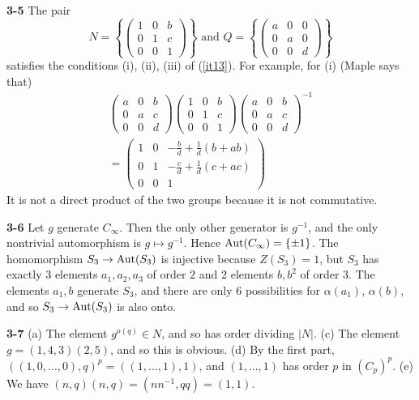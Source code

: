 \documentclass[a4paper,11pt,final,openany]{memoir}%
\theoremstyle{nonumberplain}
\begin{document}
\bigskip\noindent\textbf{3-5}
The pair
\[
N=\left\{
\begin{pmatrix}
1 & 0 & b\\
0 & 1 & c\\
0 & 0 & 1
\end{pmatrix}
\right\}  \text{ and }Q=\left\{
\begin{pmatrix}
a & 0 & 0\\
0 & a & 0\\
0 & 0 & d
\end{pmatrix}
\right\}
\]
satisfies the conditions (i), (ii), (iii) of (\ref{it13}). For example, for
(i) (Maple says that)%
\begin{align*}%
\begin{pmatrix}
a & 0 & b\\
0 & a & c\\
0 & 0 & d
\end{pmatrix}%
\begin{pmatrix}
1 & 0 & b\\
0 & 1 & c\\
0 & 0 & 1
\end{pmatrix}%
\begin{pmatrix}
a & 0 & b\\
0 & a & c\\
0 & 0 & d
\end{pmatrix}
^{-1}\allowbreak\\
=\allowbreak%
\begin{pmatrix}
1 & 0 & -\frac{b}{d}+\frac{1}{d}\left(  b+ab\right) \\
0 & 1 & -\frac{c}{d}+\frac{1}{d}\left(  c+ac\right) \\
0 & 0 & 1
\end{pmatrix}
\end{align*}
It is not a direct product of the two groups because it is not commutative.

\bigskip\noindent\textbf{3-6}
Let $g$ generate $C_{\infty}$. Then the only other generator is $g^{-1}$, and
the only nontrivial automorphism is $g\mapsto g^{-1}$. Hence $\operatorname{Aut}(C_{\infty
})=\{\pm1\}$. The homomorphism $S_{3}\rightarrow\operatorname{Aut}(S_{3})$ is injective
because $Z(S_{3})=1$, but $S_{3}$ has exactly $3$ elements $a_{1},a_{2},a_{3}$
of order $2$ and $2$ elements $b,b^{2}$ of order $3$. The elements $a_{1},b$
generate $S_{3}$, and there are only $6$ possibilities for $\alpha(a_{1})$,
$\alpha(b)$, and so $S_{3}\rightarrow\operatorname{Aut}(S_{3})$ is also onto.

\bigskip\noindent\textbf{3-7}
(a) The element $g^{o(q)}\in N$, and so has order dividing $|N|$. (c) The
element $g=(1,4,3)(2,5)$, and so this is obvious. (d) By the first part,
$\left(  (1,0,\ldots,0),q\right)  ^{p}=((1,\ldots,1),1)$, and $(1,\ldots,1)$
has order $p$ in $(C_{p})^{p}$. (e) We have $(n,q)(n,q)=(nn^{-1},qq)=(1,1).$
\end{document}
